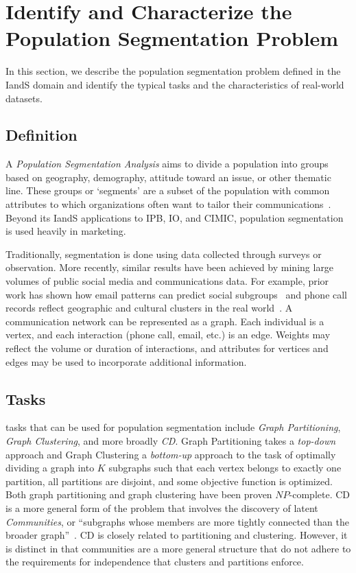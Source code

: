 \section{Identify and Characterize the Population Segmentation Problem}
\label{section:51-CD-Problem}

In this section, we describe the population segmentation problem defined in the \ac{IandS} domain and identify the typical tasks and the characteristics of real-world datasets. 

\subsection{Definition}
A \textit{Population Segmentation Analysis} aims to divide a population into groups based on geography, demography, attitude toward an issue, or other thematic line.
These groups or `segments' are a subset of the population with common attributes to which organizations often want to tailor their communications~\cite{Army2023}.
Beyond its \ac{IandS} applications to \ac{IPB}, \ac{IO}, and \ac{CIMIC}, population segmentation is used heavily in marketing.

Traditionally, segmentation is done using data collected through surveys or observation.
More recently, similar results have been achieved by mining large volumes of public social media and communications data.
For example, prior work has shown how email patterns can predict social subgroups~\cite{Zachary1977} and phone call records reflect geographic and cultural clusters in the real world~\cite{Sobolevsky2014}.
A communication network can be represented as a graph. 
Each individual is a vertex, and each interaction (phone call, email, etc.) is an edge. 
Weights may reflect the volume or duration of interactions, and attributes for vertices and edges may be used to incorporate additional information.

\subsection{Tasks}
\gai tasks that can be used for population segmentation include \textit{Graph Partitioning}, \textit{Graph Clustering}, and more broadly \textit{\ac{CD}}.
Graph Partitioning takes a \textit{top-down} approach and Graph Clustering a \textit{bottom-up} approach to the task of optimally dividing a graph into $K$ subgraphs such that each vertex belongs to exactly one partition, all partitions are disjoint, and some objective function is optimized. 
Both graph partitioning and graph clustering have been proven $NP$-complete. 
\ac{CD} is a more general form of the problem that involves the discovery of latent \textit{Communities}, or ``subgraphs whose members are more tightly connected than the broader graph''~\cite{Fortunato2007}.
\ac{CD} is closely related to partitioning and clustering. However, it is distinct in that communities are a more general structure that do not adhere to the requirements for independence that clusters and partitions enforce. 

